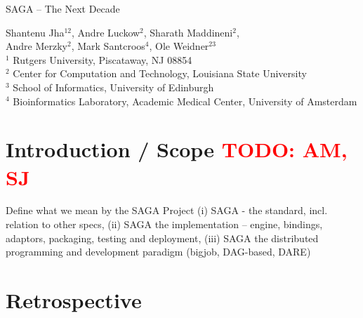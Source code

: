 \documentclass{article}
\newcommand{\B}[1]{\textbf{#1}}
\newcommand{\todo}[1]{{\textcolor{red}{\B{TODO:} #1 }}}
\begin{document}
\begin{center}
{\Large SAGA -- The Next Decade}
\end{center}

{\large
        Shantenu Jha$^{12}$,
        Andre Luckow$^{2}$,
        Sharath Maddineni$^{2}$,\\
        Andre Merzky$^{2}$,
        Mark Santcroos$^{4}$,
        Ole Weidner$^{23}$
        \\[1em]
        $^1$\tiny
         Rutgers University, 
         Piscataway, NJ 08854\\[-0.3em]
        $^2$ \tiny
          Center for Computation and Technology, 
          Louisiana State University\\[-0.3em]
        $^3$ \tiny
          School of Informatics, 
          University of Edinburgh \\[-0.3em]  
        $^4$ \tiny
         Bioinformatics Laboratory, Academic Medical Center, 
         University of Amsterdam\\[-0.3em]
       }

\begin{abstract}
  "Never let the future disturb you. You will meet it, if you have to,
  with the same weapons of reason which today arm you against the
  present."  -- Marcus Aurelius Antoninus, 'Meditations' "Panta Rhei"
  -- that phrase is ever so true for human technology.  The last
  decade has seen that confirmed for distributed computing as for any
  other field of computing or technology in general.  While it is
  notoriously hard and error prone to predict the future, we dare a
  biased and limited (aka focused) glimpse into the expected evolution
  of our specific area of interest: programming abstractions for
  distributed scientific computing.
\end{abstract}


\section{Introduction / Scope \todo{AM, SJ}}


Define what we mean by the SAGA Project (i) SAGA - the standard,
incl. relation to other specs, (ii) SAGA the implementation -- engine,
bindings, adaptors, packaging, testing and deployment, (iii) SAGA the
distributed programming and development paradigm (bigjob, DAG-based,
DARE)




\section{Retrospective}
\end{document}
